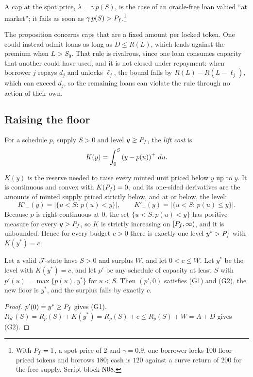 A cap at the spot price, $\lambda=\gamma\,p(S)$, is the case of an oracle-free loan valued ``at market''; it fails as soon as $\gamma\,p(S)>P_f$.\footnote{With $P_f=1$, a spot price of $2$ and $\gamma=0.9$, one borrower locks $100$ floor-priced tokens and borrows $180$; cash is $120$ against a curve return of $200$ for the free supply. Script block N08.}

\begin{remark}
The proposition concerns caps that are a fixed amount per locked token. One could instead admit loans as long as $D\le R(L)$, which lends against the premium when $L>S_0$. That rule is rivalrous, since one loan consumes capacity that another could have used, and it is not closed under repayment: when borrower $j$ repays $d_j$ and unlocks $\ell_j$, the bound falls by $R(L)-R(L-\ell_j)$, which can exceed $d_j$, so the remaining loans can violate the rule through no action of their own.
\end{remark}

\subsection{Raising the floor}\label{sec:raise}

\begin{definition}[Lift]
For a schedule $p$, supply $S>0$ and level $y\ge P_f$, the \emph{lift cost} is
\[
K(y)=\int_0^S\left(y-p(u)\right)^{+}\,du .
\]
\end{definition}

$K(y)$ is the reserve needed to raise every minted unit priced below $y$ up to $y$. It is continuous and convex with $K(P_f)=0$, and its one-sided derivatives are the amounts of minted supply priced strictly below, and at or below, the level:
\[
K'_-(y)=\bigl|\{u<S:\,p(u)<y\}\bigr|,\qquad K'_+(y)=\bigl|\{u<S:\,p(u)\le y\}\bigr| .
\]
Because $p$ is right-continuous at $0$, the set $\{u<S: p(u)<y\}$ has positive measure for every $y>P_f$, so $K$ is strictly increasing on $[P_f,\infty)$, and it is unbounded. Hence for every budget $c>0$ there is exactly one level $y^\ast>P_f$ with $K(y^\ast)=c$.

\begin{proposition}\label{prop:raise}
Let a valid $\mathcal{J}$-state have $S>0$ and surplus $W$, and let $0<c\le W$. Let $y^\ast$ be the level with $K(y^\ast)=c$, and let $p'$ be any schedule of capacity at least $S$ with $p'(u)=\max\{p(u),y^\ast\}$ for $u<S$. Then $(p',0)$ satisfies (G1) and (G2), the new floor is $y^\ast$, and the surplus falls by exactly $c$.
\end{proposition}
\begin{proof}
$p'(0)=y^\ast\ge P_f$ gives (G1). $R_{p'}(S)=R_p(S)+K(y^\ast)=R_p(S)+c\le R_p(S)+W=A+D$ gives (G2).
\end{proof}

